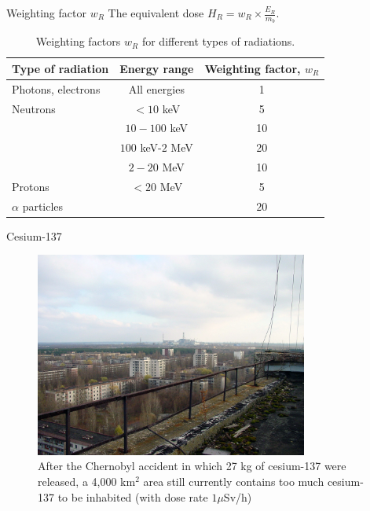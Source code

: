 \documentclass[10pt]{beamer}
\begin{document}
\begin{frame}{Weighting factor $w_R$}
The equivalent dose $H_R = w_R \times \frac{E_R}{m_b}.$
\begin{table}
\begin{tabular}{l c c}
\toprule
Type of radiation & Energy range & Weighting factor, $w_R$\\
\hline
Photons, electrons & All energies & 1\\
Neutrons & $<10$ keV & 5 \\
& $10-100$ keV & 10 \\
& $100$ keV-$2$ MeV & 20 \\
& $2-20$ MeV & 10 \\
Protons & $<20$ MeV & 5 \\
$\alpha$ particles& & $20$\\
\bottomrule
\end{tabular}
\caption*{Weighting factors $w_R$ for different types of radiations. \cite{icrp74}}
\end{table}
\end{frame}
\begin{frame}{Cesium-137}
\begin{figure}
\centering
\includegraphics[width=0.8\textwidth]{Priyat}
\caption*{After the Chernobyl accident in which 27 kg of cesium-137 were released, a 4,000 km${}^2$ area still currently contains too much cesium-137 to be inhabited (with dose rate $1\mu$Sv/h)}
\end{figure}

\end{frame}
\end{document}
